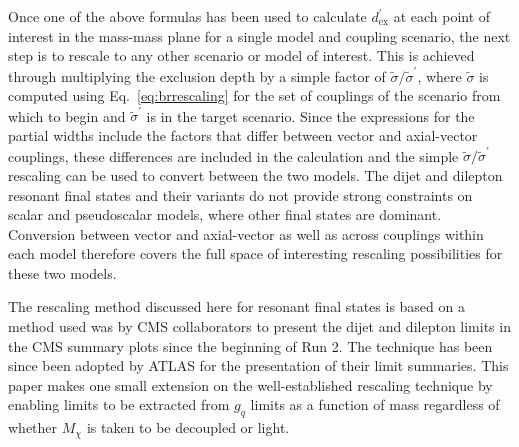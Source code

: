 \documentclass[a4paper, 11pt]{article}
\newcommand{\mdm}{\ensuremath{M_{\chi}}\xspace}
\begin{document}
Once one of the above formulas has been used to calculate $d_\text{ex}^\prime$ at each point of interest in the mass-mass plane for a single model and coupling scenario, the next step is to rescale to any other scenario or model of interest. This is achieved through multiplying the exclusion depth by a simple factor of $\tilde{\sigma}/\tilde{\sigma}^\prime$, where $\tilde{\sigma}$ is computed using Eq.~\ref{eq:brrescaling} for the set of couplings of the scenario from which to begin and $\tilde{\sigma}^\prime$ is in the target scenario.
Since the expressions for the partial widths include the factors that differ between vector and axial-vector couplings, these differences are included in the calculation and the simple $\tilde{\sigma}/\tilde{\sigma}^\prime$ rescaling can be used to convert between the two models. The dijet and dilepton resonant final states and their variants do not provide strong constraints on scalar and pseudoscalar models, where other final states are dominant. Conversion between vector and axial-vector as well as across couplings within each model therefore covers the full space of interesting rescaling possibilities for these two models.

The rescaling method discussed here for resonant final states
is based on a method used was by CMS collaborators to present the dijet and dilepton limits in the CMS summary plots since the beginning of Run 2.
The technique has been since been adopted by ATLAS for the presentation of their limit summaries. This paper makes one small extension on the well-established rescaling technique by enabling limits to be extracted from $g_q$ limits as a function of mass regardless of whether \mdm is taken to be decoupled or light. 
\end{document}
